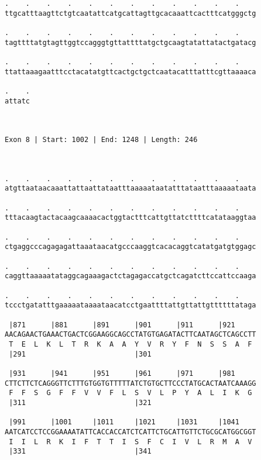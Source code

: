 \documentclass{article}
\begin{document}
\begin{Verbatim}
.    .    .    .    .    .    .    .    .    .    .    .    
ttgcatttaagttctgtcaatattcatgcattagttgcacaaattcactttcatgggctg
                                                            
.    .    .    .    .    .    .    .    .    .    .    .    
tagttttatgtagttggtccagggtgttattttatgctgcaagtatattatactgatacg
                                                            
.    .    .    .    .    .    .    .    .    .    .    .    
ttattaaagaatttcctacatatgttcactgctgctcaatacatttatttcgttaaaaca
                                                            
.    .
attatc
      
      
 
Exon 8 | Start: 1002 | End: 1248 | Length: 246



.    .    .    .    .    .    .    .    .    .    .    .    
atgttaataacaaattattaattataatttaaaaataatatttataatttaaaaataata
                                                            
.    .    .    .    .    .    .    .    .    .    .    .    
tttacaagtactacaagcaaaacactggtactttcattgttatcttttcatataaggtaa
                                                            
.    .    .    .    .    .    .    .    .    .    .    .    
ctgaggcccagagagattaaataacatgcccaaggtcacacaggtcatatgatgtggagc
                                                            
.    .    .    .    .    .    .    .    .    .    .    .    
caggttaaaaatataggcagaaagactctagagaccatgctcagatcttccattccaaga
                                                            
.    .    .    .    .    .    .    .    .    .    .    .    
tccctgatatttgaaaaataaaataacatcctgaattttattgttattgttttttataga
                                                            
 |871      |881      |891      |901      |911      |921     
AACAGAACTGAAACTGACTCGGAAGGCAGCCTATGTGAGATACTTCAATAGCTCAGCCTT
 T  E  L  K  L  T  R  K  A  A  Y  V  R  Y  F  N  S  S  A  F 
 |291                          |301                         
  
 |931      |941      |951      |961      |971      |981     
CTTCTTCTCAGGGTTCTTTGTGGTGTTTTTATCTGTGCTTCCCTATGCACTAATCAAAGG
 F  F  S  G  F  F  V  V  F  L  S  V  L  P  Y  A  L  I  K  G 
 |311                          |321                         
  
 |991      |1001     |1011     |1021     |1031     |1041    
AATCATCCTCCGGAAAATATTCACCACCATCTCATTCTGCATTGTTCTGCGCATGGCGGT
 I  I  L  R  K  I  F  T  T  I  S  F  C  I  V  L  R  M  A  V 
 |331                          |341                         
  

\end{Verbatim}
\end{document}
